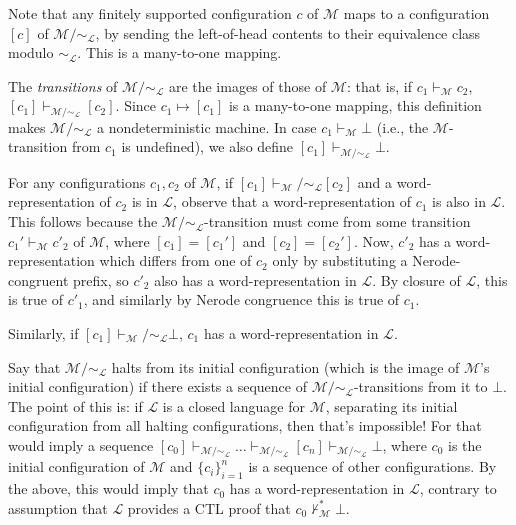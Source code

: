 Note that any finitely supported configuration $c$ of $\mathcal{M}$ maps to a configuration $[c]$ of $\mathcal{M}/\sim_{\mathcal{L}}$, by sending the left-of-head contents to their equivalence class modulo $\sim_\mathcal{L}$.
This is a many-to-one mapping.

The \emph{transitions} of $\mathcal{M}/\sim_{\mathcal{L}}$ are the images of those of $\mathcal{M}$: that is, if $c_1\vdash_\mathcal{M} c_2$, $[c_1]\vdash_{\mathcal{M}/\sim_\mathcal{L}} [c_2]$. Since $c_1\mapsto[c_1]$ is a many-to-one mapping, this definition makes $\mathcal{M}/\sim_\mathcal{L}$ a nondeterministic machine.
In case $c_1\vdash_\mathcal{M}\bot$ (i.e., the $\mathcal{M}$-transition from $c_1$ is undefined), we also define $[c_1]\vdash_{\mathcal{M}/\sim_\mathcal{L}}\bot$.

For any configurations $c_1,c_2$ of $\mathcal{M}$, if $[c_1]\vdash_\mathcal{M}/\sim_\mathcal{L} [c_2]$ and a word-representation of $c_2$ is in $\mathcal{L}$, observe that a word-representation of $c_1$ is also in $\mathcal{L}$.
This follows because the $\mathcal{M}/\sim_\mathcal{L}$-transition must come from some transition $c_1'\vdash_\mathcal{M}c'_2$ of $\mathcal{M}$, where $[c_1]=[c_1']$ and $[c_2]=[c_2']$. Now, $c'_2$ has a word-representation which differs from one of $c_2$ only by substituting a Nerode-congruent prefix, so $c'_2$ also has a word-representation in $\mathcal{L}$. By closure of $\mathcal{L}$, this is true of $c'_1$, and similarly by Nerode congruence this is true of $c_1$.

Similarly, if $[c_1]\vdash_\mathcal{M}/\sim_\mathcal{L}\bot$, $c_1$ has a word-representation in $\mathcal{L}$.

Say that $\mathcal{M}/\sim_\mathcal{L}$ halts from its initial configuration (which is the image of $\mathcal{M}$'s initial configuration) if there exists a sequence of $\mathcal{M}/\sim_\mathcal{L}$-transitions from it to $\bot$.
The point of this is: if $\mathcal{L}$ is a closed language for $\mathcal{M}$, separating its initial configuration from all halting configurations, then that's impossible!
For that would imply a sequence $[c_0]\vdash_{\mathcal{M}/\sim_\mathcal{L}}\dots\vdash_{\mathcal{M}/\sim_\mathcal{L}}[c_n]\vdash_{\mathcal{M}/\sim_\mathcal{L}}\bot$, where $c_0$ is the initial configuration of $\mathcal{M}$ and $\{c_i\}_{i=1}^n$ is a sequence of other configurations.
By the above, this would imply that $c_0$ has a word-representation in $\mathcal{L}$, contrary to assumption that $\mathcal{L}$ provides a CTL proof that $c_0\not\vdash^*_\mathcal{M}\bot$.

